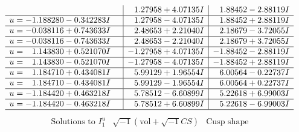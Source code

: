 \documentclass[1p]{elsarticle_modified}
\theoremstyle{definition}
\newcommand{\I}{\sqrt{-1}}
\begin{document}
$$\begin{array}{c|c|c}
 & \phantom{-}1.27958 + 4.07135 I & \phantom{-}1.88452 - 2.88119 I \\ \hline\begin{aligned}
u &= -1.188280 - 0.342283 I\end{aligned}
 & \phantom{-}1.27958 - 4.07135 I & \phantom{-}1.88452 + 2.88119 I \\ \hline\begin{aligned}
u &= -0.038116 + 0.743633 I\end{aligned}
 & \phantom{-}2.48653 + 2.21040 I & \phantom{-}2.18679 - 3.72055 I \\ \hline\begin{aligned}
u &= -0.038116 - 0.743633 I\end{aligned}
 & \phantom{-}2.48653 - 2.21040 I & \phantom{-}2.18679 + 3.72055 I \\ \hline\begin{aligned}
u &= \phantom{-}1.143830 + 0.521070 I\end{aligned}
 & -1.27958 + 4.07135 I & -1.88452 - 2.88119 I \\ \hline\begin{aligned}
u &= \phantom{-}1.143830 - 0.521070 I\end{aligned}
 & -1.27958 - 4.07135 I & -1.88452 + 2.88119 I \\ \hline\begin{aligned}
u &= \phantom{-}1.184710 + 0.434081 I\end{aligned}
 & \phantom{-}5.99129 + 1.96554 I & \phantom{-}6.00564 - 0.22737 I \\ \hline\begin{aligned}
u &= \phantom{-}1.184710 - 0.434081 I\end{aligned}
 & \phantom{-}5.99129 - 1.96554 I & \phantom{-}6.00564 + 0.22737 I \\ \hline\begin{aligned}
u &= -1.184420 + 0.463218 I\end{aligned}
 & \phantom{-}5.78512 - 6.60899 I & \phantom{-}5.22618 + 6.99003 I \\ \hline\begin{aligned}
u &= -1.184420 - 0.463218 I\end{aligned}
 & \phantom{-}5.78512 + 6.60899 I & \phantom{-}5.22618 - 6.99003 I\\
 \hline 
 \end{array}$$\newpage$$\begin{array}{c|c|c}  
\text{Solutions to }I^u_{1}& \I (\text{vol} + \sqrt{-1}CS) & \text{Cusp shape}\\

\end{array}$$
\end{document}
